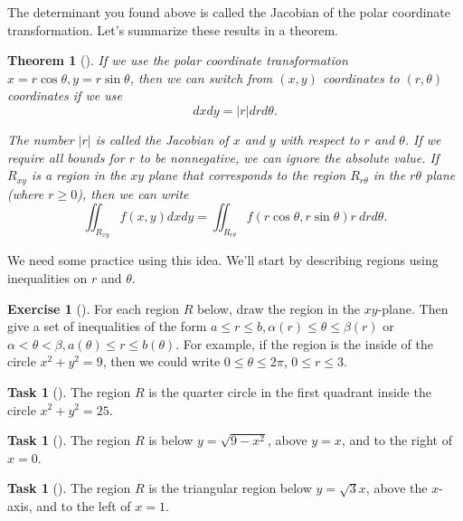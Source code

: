 \documentclass[10pt,]{book}
\theoremstyle{plain}
\newtheorem{theorem}{Theorem}[section]
\theoremstyle{definition}
\theoremstyle{definition}
\theoremstyle{definition}
\theoremstyle{definition}
\newtheorem{exploration}[project]{Exercise}
\newtheorem{task}[project]{Task}
\theoremstyle{definition}
\numberwithin{equation}{section}
\newcommand{\lt}{<}
\begin{document}
The determinant you found above is called the Jacobian of the polar coordinate transformation. Let's summarize these results in a theorem.%
\begin{theorem}[{}]\label{theorem-10}
If we use the polar coordinate transformation \(x=r\cos\theta, y=r\sin\theta\), then we can switch from \((x,y)\) coordinates to \((r,\theta)\) coordinates if we use%
\begin{equation*}
dxdy=|r|drd\theta.
\end{equation*}
%
\par
The number \(|r|\) is called the Jacobian of \(x\) and \(y\) with respect to \(r\) and \(\theta\). If we require all bounds for \(r\) to be nonnegative, we can ignore the absolute value. If \(R_{xy}\) is a region in the \(xy\) plane that corresponds to the region \(R_{r\theta}\) in the \(r\theta\) plane (where \(r\geq 0\)), then we can write%
\begin{equation*}
\iint_{R_{xy}} f(x,y) dxdy = \iint_{R_{r\theta}} f(r\cos\theta,r\sin\theta) r\ drd\theta.
\end{equation*}
%
\end{theorem}
We need some practice using this idea. We'll start by describing regions using inequalities on \(r\) and \(\theta\).%
\begin{exploration}[]\label{exploration-264}
For each region \(R\) below, draw the region in the \(xy\)-plane. Then give a set of inequalities of the form \(a\leq r\leq b, \alpha(r)\leq \theta \leq \beta(r)\) or \(\alpha\lt \theta\lt \beta, a(\theta)\leq r\leq b(\theta)\). For example, if the region is the inside of the circle \(x^2+y^2=9\), then we could write \(0\leq \theta\leq 2\pi\), \(0\leq r\leq 3\).%
\begin{task}[]\label{task-716}
The region \(R\) is the quarter circle in the first quadrant inside the circle \(x^2+y^2=25\).%
\end{task}
\begin{task}[]\label{task-717}
The region \(R\) is below \(y=\sqrt{9-x^2}\), above \(y=x\), and to the right of \(x=0\).%
\end{task}
\begin{task}[]\label{task-718}
The region \(R\) is the triangular region below \(y=\sqrt 3 x\), above the \(x\)-axis, and to the left of \(x=1\).%
\end{task}
\end{exploration}
\end{document}
